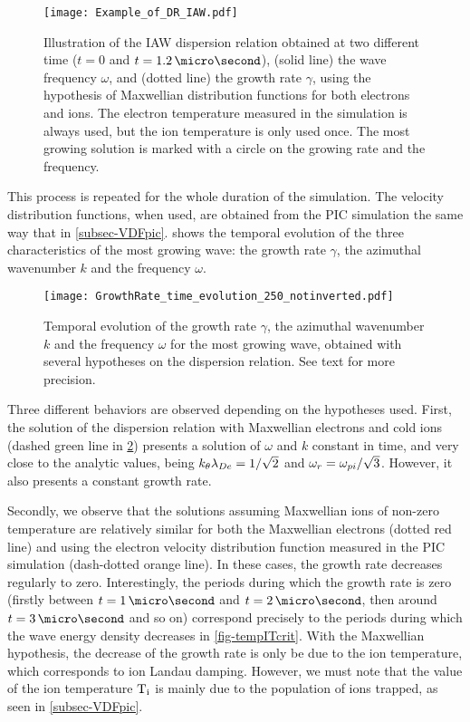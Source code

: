     \begin{figure}[hbt]
      \centering
      \texttt{[image: Example\_of\_DR\_IAW.pdf]}
      \caption{Illustration of the \acs{IAW} dispersion relation obtained at two different time ($t=0$ and $t=1.2\,\micro\second$), (solid line) the wave frequency $\omega$, and (dotted line) the growth rate $\gamma$, using the hypothesis of Maxwellian distribution functions for both electrons and ions. The electron temperature measured in the simulation is always used, but the ion temperature is only used once. The most growing solution is marked with a circle on the growing rate and the frequency.}
      \label{fig-Example_of_DR_IAW}
    \end{figure}
    
    
    This process is repeated for the whole duration of the simulation.
    The velocity distribution functions, when used, are obtained from the \ac{PIC} simulation the same way that in \cref{subsec-VDFpic}.
     shows the temporal evolution of the three characteristics of the most growing wave: the growth rate $\gamma$, the azimuthal wavenumber $k$ and the frequency $\omega$.
    \begin{figure}[hbt]
      \centering
      \texttt{[image: GrowthRate\_time\_evolution\_250\_notinverted.pdf]}  %
      \caption{Temporal evolution of the growth rate $\gamma$, the azimuthal wavenumber $k$ and the frequency $\omega$ for the most growing wave, obtained with several hypotheses on the dispersion relation. See text for more precision. }
      \label{fig-time_wave}
    \end{figure}
    
    Three different behaviors are observed depending on the hypotheses used.
    First, the solution of the dispersion relation with Maxwellian electrons and cold ions (dashed green line in \cref{fig-time_wave}) presents a solution of $\omega$ and $k$ constant in time, and very close to the analytic values, being $k_{\theta}\lambda_{De} = 1/\sqrt{2}$ and $\omega_r = \omega_{pi}/\sqrt{3}$.
    However, it also presents a constant growth rate.
    
    Secondly, we observe that the solutions assuming Maxwellian ions of non-zero temperature are relatively similar for both the Maxwellian electrons  (dotted red line) and using the electron velocity distribution function measured in the \ac{PIC} simulation (dash-dotted orange line).
    In these cases, the growth rate decreases regularly to zero.
    Interestingly, the periods during which the growth rate is zero (firstly between $t=1\,\micro\second$ and $t=2\,\micro\second$, then around $t=3\,\micro\second$ and so on) correspond precisely to the periods during which the wave energy density decreases in \cref{fig-tempITcrit}.
    With the Maxwellian hypothesis, the decrease of the growth rate is only be due to the ion temperature, which corresponds to ion Landau damping.
    However, we must note that the value of the ion temperature $\mathrm{T_i}$ is mainly due to the population of ions trapped, as seen in \cref{subsec-VDFpic}.
    
